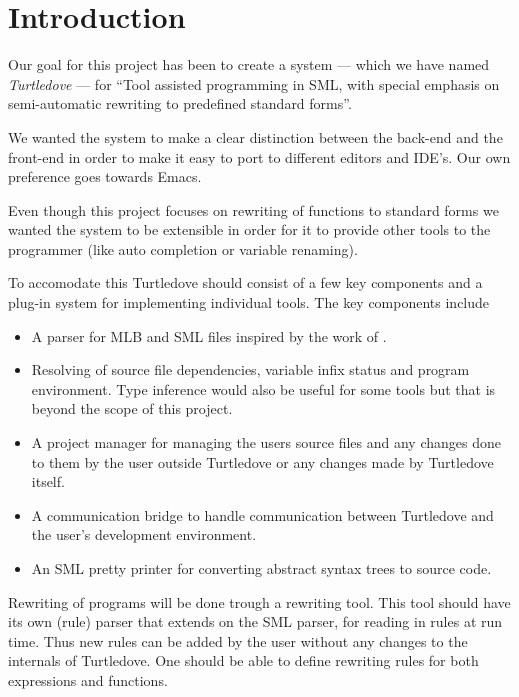 \chapter{Introduction}\label{chap:introduction}
Our goal for this project has been to create a system --- which we have named
\textit{Turtledove} --- for ``Tool assisted programming in SML, with special
emphasis on semi-automatic rewriting to predefined standard forms''.

We wanted the system to make a clear distinction between the back-end and the
front-end in order to make it easy to port to different editors and IDE's. Our
own preference goes towards Emacs.

Even though this project focuses on rewriting of functions to standard forms we
wanted the system to be extensible in order for it to provide other tools to the
programmer (like auto completion or variable renaming).

To accomodate this Turtledove should consist of a few key components and a
plug-in system for implementing individual tools. The key components include
\begin{itemize}
\item A parser for MLB and SML files inspired by the work of \cite{mbp08}.
\item Resolving of source file dependencies, variable infix status and program
  environment. Type inference would also be useful for some tools but that is
  beyond the scope of this project.
\item A project manager for managing the users source files and any changes done
  to them by the user outside Turtledove or any changes made by Turtledove
  itself.
\item A communication bridge to handle communication between Turtledove and the
  user's development environment.
\item An SML pretty printer for converting abstract syntax trees to source code.
\end{itemize}

Rewriting of programs will be done trough a rewriting tool. This tool should
have its own (rule) parser that extends on the SML parser, for reading in rules
at run time. Thus new rules can be added by the user without any changes to the
internals of Turtledove. One should be able to define rewriting rules for both
expressions and functions.

